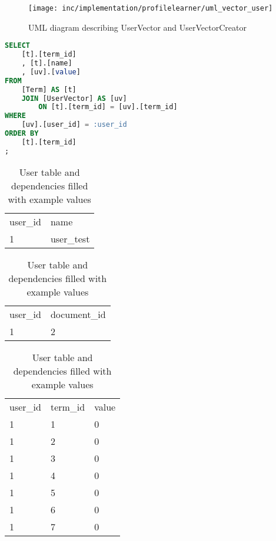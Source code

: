 \begin{figure}[h]
    \center
    \texttt{[image: inc/implementation/profilelearner/uml\_vector\_user]}
    \caption{UML diagram describing UserVector and UserVectorCreator}
    \label{fig:uml_vector_user}
\end{figure}

\begin{lstlisting}[language=SQL,caption={SQL query for creating a user vector},label={lst:user-vector-query},float=h]
SELECT
    [t].[term_id]
    , [t].[name]
    , [uv].[value]
FROM
    [Term] AS [t]
    JOIN [UserVector] AS [uv]
        ON [t].[term_id] = [uv].[term_id]
WHERE
    [uv].[user_id] = :user_id
ORDER BY
    [t].[term_id]
;
\end{lstlisting}

\begin{table}
    \begin{tabular}{ l | l }
        \rowcolor{\dustRowHead}
        \multicolumn{2}{c}{\textbf{User}}\\\hline
        user\_id    & name \\\hline
        1           & user\_test\\
    \end{tabular}
    \quad
    \begin{tabular}{ l | l }
        \rowcolor{\dustRowHead}
        \multicolumn{2}{c}{UserPreference}\\\hline
        user\_id    & document\_id\\\hline
        1           & 2\\
    \end{tabular}
    \quad
    \begin{tabular}{ l | l | l }
        \rowcolor{\dustRowHead}
        \multicolumn{3}{c}{UserVector}\\\hline
        user\_id    & term\_id  & value\\\hline
        1           & 1         & 0\\
        1           & 2         & 0\\
        1           & 3         & 0\\
        1           & 4         & 0\\
        1           & 5         & 0\\
        1           & 6         & 0\\
        1           & 7         & 0\\
    \end{tabular}
    \caption{User table and dependencies filled with example values}
    \label{tab:user}
\end{table}

